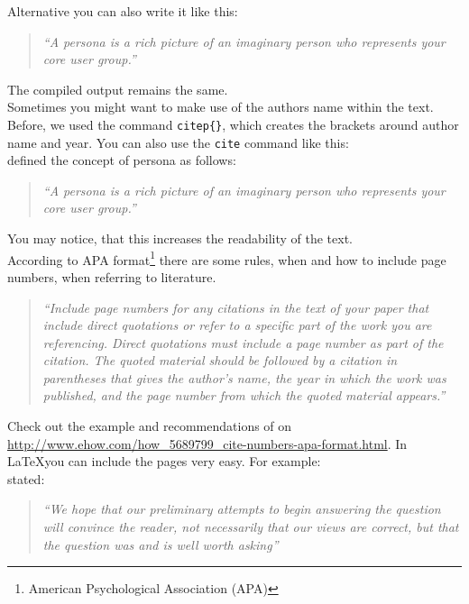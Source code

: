 Alternative you can also write it like this:

\begin{quotation}
	\textit{\enquote{A persona is a rich picture of an imaginary person who represents your core user group.}} \citep{Dix04}
\end{quotation}

The compiled output remains the same. \\

Sometimes you might want to make use of the authors name within the text. Before, we used the command \texttt{citep\{\}}, which creates the brackets around author name and year. You can also use the \texttt{cite} command like this: \\

\cite{Dix04} defined the concept of persona as follows: 
\begin{quotation}
	\emph{``A persona is a rich picture of an imaginary person who represents your core user group.''}
	\citep{Dix04}
\end{quotation}

You may notice, that this increases the readability of the text. \\

According to APA format\footnote{ American Psychological Association (APA)} there are some rules, when and how to include page numbers, when referring to literature. 

\begin{quotation}
	\emph{``Include page numbers for any citations in the text of your paper that include direct quotations or refer to a specific part of the work you are referencing. Direct quotations must include a page number as part of the citation. The quoted material should be followed by a citation in parentheses that gives the author's name, the year in which the work was published, and the page number from which the quoted material appears.''}
	\citep{Hall}
\end{quotation}

Check out the example and recommendations of \cite{Hall} on \url{http://www.ehow.com/how_5689799_cite-numbers-apa-format.html}. In \LaTeX you can include the pages very easy. For example: \\

\citet[p. 86]{Baddeley:1974ts} stated: 

\begin{quotation}
	\emph{``We hope that our preliminary attempts to begin answering the question will convince the reader, not necessarily that our views are correct, but that the question was and is well worth asking''}
	\citep[p. 86]{Baddeley:1974ts}
\end{quotation}

